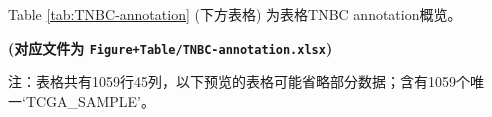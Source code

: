 \documentclass[
]{article}
\begin{document}
\begin{center}\vspace{1.5cm}\end{center}

Table \ref{tab:TNBC-annotation} (下方表格) 为表格TNBC annotation概览。

\textbf{(对应文件为 \texttt{Figure+Table/TNBC-annotation.xlsx})}

\begin{center}\begin{tcolorbox}[colback=gray!10, colframe=gray!50, width=0.9\linewidth, arc=1mm, boxrule=0.5pt]注：表格共有1059行45列，以下预览的表格可能省略部分数据；含有1059个唯一`TCGA\_SAMPLE'。
\end{tcolorbox}
\end{center}
\end{document}
